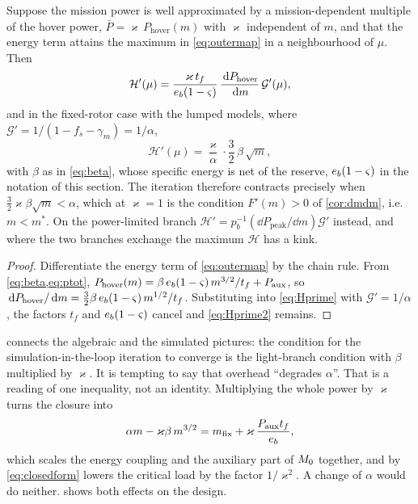 \begin{proposition}
\label{prop:contraction}
Suppose the mission power is well approximated by a mission-dependent multiple
of the hover power, $\bar P = \varkappa\,P_{\mathrm{hover}}(m)$ with $\varkappa$
independent of $m$, and that the energy term attains the maximum in
\cref{eq:outermap} in a neighbourhood of $\mu$. Then
\begin{equation}
  \mathcal{H}'(\mu)
  = \frac{\varkappa\,t_f}{e_b(1-\varsigma)}\,
    \frac{\,\mathrm{d} P_{\mathrm{hover}}}{\,\mathrm{d} m}\,\mathcal{G}'(\mu),
  \label{eq:Hprime}
\end{equation}
and in the fixed-rotor case with the lumped models, where
$\mathcal{G}'=1/(1-f_s-\gamma_m)=1/\alpha$,
\begin{equation}
  \mathcal{H}'(\mu) = \frac{\varkappa}{\alpha}\cdot
    \frac{3}{2}\,\beta\,\sqrt{m} ,
  \label{eq:Hprime2}
\end{equation}
with $\beta$ as in \cref{eq:beta}, whose specific energy is net of the reserve,
$e_b(1-\varsigma)$ in the notation of this section. The iteration therefore
contracts precisely when $\tfrac32\varkappa\beta\sqrt m < \alpha$, which at
$\varkappa=1$ is the condition $F'(m)>0$ of \cref{cor:dmdm}, i.e.\ $m<m^*$. On
the power-limited branch $\mathcal{H}' = p_b^{-1}(\dd P_{\mathrm{peak}}/\dd m)
\mathcal{G}'$ instead, and where the two branches exchange the maximum
$\mathcal{H}$ has a kink.
\end{proposition}

\begin{proof}
Differentiate the energy term of \cref{eq:outermap} by the chain rule. From
\cref{eq:beta,eq:ptot},
$P_{\mathrm{hover}}(m) = \beta\,e_b(1-\varsigma)\, m^{3/2}/t_f + P_{\mathrm{aux}}$, so
$\,\mathrm{d} P_{\mathrm{hover}}/\,\mathrm{d} m = \tfrac32\beta\,e_b(1-\varsigma)\, m^{1/2}/t_f$.
Substituting into \cref{eq:Hprime} with $\mathcal{G}'=1/\alpha$, the factors
$t_f$ and $e_b(1-\varsigma)$ cancel and \cref{eq:Hprime2} remains.
\end{proof}

\begin{remark}
 connects the algebraic and the simulated pictures: the
condition for the simulation-in-the-loop iteration to converge is the
light-branch condition with $\beta$ multiplied by $\varkappa$. It is tempting to
say that overhead ``degrades $\alpha$''. That is a reading of one inequality,
not an identity. Multiplying the whole power by $\varkappa$ turns the closure
into
\begin{equation}
  \alpha m - \varkappa\beta\, m^{3/2}
  = m_{\mathrm{fix}} + \varkappa\,\frac{P_{\mathrm{aux}} t_f}{e_b},
  \label{eq:kappaclosure}
\end{equation}
which scales the energy coupling and the auxiliary part of $M_0$ together,
and by \cref{eq:closedform} lowers the critical load by the factor
$1/\varkappa^2$. A change of $\alpha$ would do neither.  shows
both effects on the design.
\end{remark}

